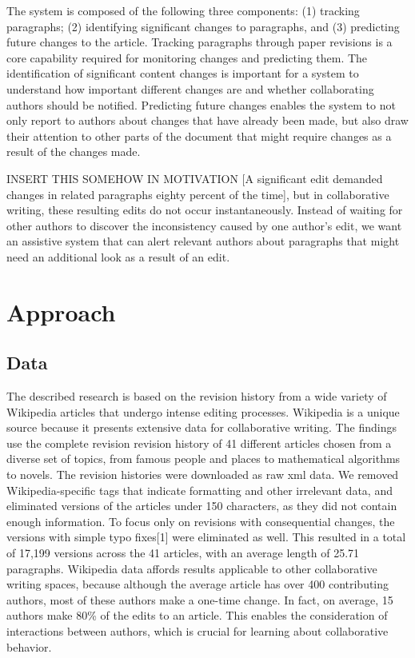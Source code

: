 The system is composed of the following three components: (1) tracking
paragraphs; (2) identifying significant changes to paragraphs, and (3)
predicting future changes to the article. Tracking paragraphs through
paper revisions is a core capability required for monitoring changes and
predicting them. The identification of significant content changes is
important for a system to understand how important different changes are
and whether collaborating authors should be notified. Predicting future
changes enables the system to not only report to authors about changes
that have already been made, but also draw their attention to other
parts of the document that might require changes as a result of the
changes made.

INSERT THIS SOMEHOW IN MOTIVATION {[}A significant edit demanded changes
in related paragraphs eighty percent of the time{]}, but in
collaborative writing, these resulting edits do not occur
instantaneously. Instead of waiting for other authors to discover the
inconsistency caused by one author's edit, we want an assistive system
that can alert relevant authors about paragraphs that might need an
additional look as a result of an edit.

\section{Approach}\label{approach}

\subsection{Data}\label{data}

The described research is based on the revision history from a wide
variety of Wikipedia articles that undergo intense editing processes.
Wikipedia is a unique source because it presents extensive data for
collaborative writing. The findings use the complete revision revision
history of 41 different articles chosen from a diverse set of topics,
from famous people and places to mathematical algorithms to novels. The
revision histories were downloaded as raw xml data. We removed
Wikipedia-specific tags that indicate formatting and other irrelevant
data, and eliminated versions of the articles under 150 characters, as
they did not contain enough information. To focus only on revisions with
consequential changes, the versions with simple typo fixes{[}1{]} were
eliminated as well. This resulted in a total of 17,199 versions across
the 41 articles, with an average length of 25.71 paragraphs. Wikipedia
data affords results applicable to other collaborative writing spaces,
because although the average article has over 400 contributing authors,
most of these authors make a one-time change. In fact, on average, 15
authors make 80\% of the edits to an article. This enables the
consideration of interactions between authors, which is crucial for
learning about collaborative behavior.

